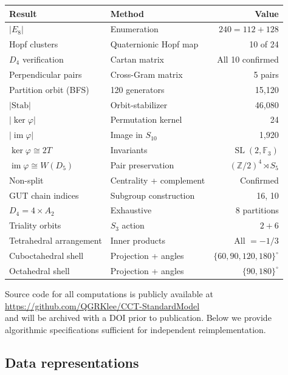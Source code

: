 \documentclass[11pt,reqno]{amsart}
\theoremstyle{plain}
\theoremstyle{definition}
\theoremstyle{remark}
\newcommand{\Z}{\mathbb{Z}}
\newcommand{\F}{\mathbb{F}}
\newcommand{\Stab}{\mathrm{Stab}}
\DeclareMathOperator{\SL}{SL}
\begin{document}
\begin{center}
\begin{tabular}{@{}llr@{}}
\toprule
Result & Method & Value \\
\midrule
$|E_8|$ & Enumeration & $240 = 112 + 128$ \\
Hopf clusters & Quaternionic Hopf map & 10 of 24 \\
$D_4$ verification & Cartan matrix & All 10 confirmed \\
Perpendicular pairs & Cross-Gram matrix & 5 pairs \\
Partition orbit (BFS) & 120 generators & 15{,}120 \\
$|\Stab|$ & Orbit-stabilizer & 46{,}080 \\
$|\ker\varphi|$ & Permutation kernel & 24 \\
$|\operatorname{im}\varphi|$ & Image in $S_{10}$ & 1{,}920 \\
$\ker\varphi \cong 2T$ & Invariants & $\SL(2,\F_3)$ \\
$\operatorname{im}\varphi \cong W(D_5)$ & Pair preservation
  & $(\Z/2)^4 \rtimes S_5$ \\
Non-split & Centrality + complement & Confirmed \\
GUT chain indices & Subgroup construction & 16, 10 \\
$D_4 = 4 \times A_2$ & Exhaustive & 8 partitions \\
Triality orbits & $S_3$ action & $2 + 6$ \\
Tetrahedral arrangement & Inner products & All $= -1/3$ \\
Cuboctahedral shell & Projection + angles & $\{60,90,120,180\}^\circ$ \\
Octahedral shell & Projection + angles & $\{90, 180\}^\circ$ \\
\bottomrule
\end{tabular}
\end{center}

Source code for all computations is publicly available at\\
\url{https://github.com/QGRKlee/CCT-StandardModel}\\
and will be archived with a DOI prior to publication.
Below we provide algorithmic specifications sufficient
for independent reimplementation.

\subsection{Data representations}
\end{document}
